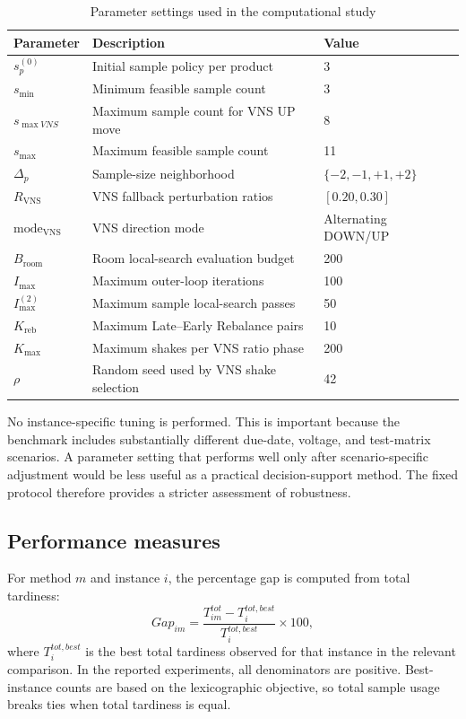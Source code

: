 \documentclass[11pt]{article}
\newcommand{\compacttable}{%
  \footnotesize
  \setlength{\tabcolsep}{2.8pt}%
  \renewcommand{\arraystretch}{0.86}%
}
\begin{document}
\begin{table}[H]
\centering
\caption{Parameter settings used in the computational study}
\label{tab:param_settings_short}
\compacttable
\begin{tabular}{lll}
\hline
\textbf{Parameter} & \textbf{Description} & \textbf{Value} \\
\hline
\(s_p^{(0)}\) & Initial sample policy per product & 3 \\
\(s_{\min}\) & Minimum feasible sample count & 3 \\
\(s_{\max VNS}\) & Maximum sample count for VNS UP move & 8 \\
\(s_{\max}\) & Maximum feasible sample count & 11 \\
\(\Delta_p\) & Sample-size neighborhood & \(\{-2,-1,+1,+2\}\) \\
\(R_{\mathrm{VNS}}\) & VNS fallback perturbation ratios & \([0.20,0.30]\) \\
\(\mathrm{mode}_{\mathrm{VNS}}\) & VNS direction mode & Alternating DOWN/UP \\
\(B_{\mathrm{room}}\) & Room local-search evaluation budget & 200 \\
\(I_{\max}\) & Maximum outer-loop iterations & 100 \\
\(I_{\max}^{(2)}\) & Maximum sample local-search passes & 50 \\
\(K_{\mathrm{reb}}\) & Maximum Late--Early Rebalance pairs & 10 \\
\(K_{\max}\) & Maximum shakes per VNS ratio phase & 200 \\
\(\rho\) & Random seed used by VNS shake selection & 42 \\
\hline
\end{tabular}
\end{table}

No instance-specific tuning is performed. This is important because the benchmark includes substantially different due-date, voltage, and test-matrix scenarios. A parameter setting that performs well only after scenario-specific adjustment would be less useful as a practical decision-support method. The fixed protocol therefore provides a stricter assessment of robustness.

\subsection{Performance measures}
\label{subsec:metrics}

For method \(m\) and instance \(i\), the percentage gap is computed from total tardiness:
\[
Gap_{im}=
\frac{T^{tot}_{im}-T^{tot,best}_{i}}
{T^{tot,best}_{i}}\times 100,
\]
where \(T^{tot,best}_{i}\) is the best total tardiness observed for that instance in the relevant comparison. In the reported experiments, all denominators are positive. Best-instance counts are based on the lexicographic objective, so total sample usage breaks ties when total tardiness is equal.
\end{document}

